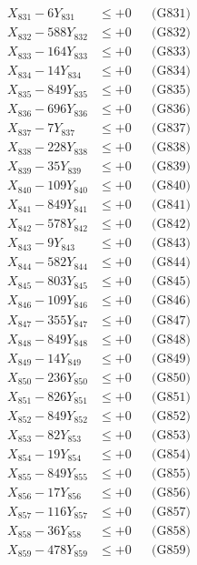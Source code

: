 \documentclass[a4paper,10pt]{article}
\begin{document}
{\begin{align}
\allowbreak
X_{831} - 6Y_{831} &\leq +0 && \text{(G831)} \\
X_{832} - 588Y_{832} &\leq +0 && \text{(G832)} \\
X_{833} - 164Y_{833} &\leq +0 && \text{(G833)} \\
X_{834} - 14Y_{834} &\leq +0 && \text{(G834)} \\
X_{835} - 849Y_{835} &\leq +0 && \text{(G835)} \\
X_{836} - 696Y_{836} &\leq +0 && \text{(G836)} \\
X_{837} - 7Y_{837} &\leq +0 && \text{(G837)} \\
X_{838} - 228Y_{838} &\leq +0 && \text{(G838)} \\
X_{839} - 35Y_{839} &\leq +0 && \text{(G839)} \\
X_{840} - 109Y_{840} &\leq +0 && \text{(G840)} \\
\allowbreak
X_{841} - 849Y_{841} &\leq +0 && \text{(G841)} \\
X_{842} - 578Y_{842} &\leq +0 && \text{(G842)} \\
X_{843} - 9Y_{843} &\leq +0 && \text{(G843)} \\
X_{844} - 582Y_{844} &\leq +0 && \text{(G844)} \\
X_{845} - 803Y_{845} &\leq +0 && \text{(G845)} \\
X_{846} - 109Y_{846} &\leq +0 && \text{(G846)} \\
X_{847} - 355Y_{847} &\leq +0 && \text{(G847)} \\
X_{848} - 849Y_{848} &\leq +0 && \text{(G848)} \\
X_{849} - 14Y_{849} &\leq +0 && \text{(G849)} \\
X_{850} - 236Y_{850} &\leq +0 && \text{(G850)} \\
\allowbreak
X_{851} - 826Y_{851} &\leq +0 && \text{(G851)} \\
X_{852} - 849Y_{852} &\leq +0 && \text{(G852)} \\
X_{853} - 82Y_{853} &\leq +0 && \text{(G853)} \\
X_{854} - 19Y_{854} &\leq +0 && \text{(G854)} \\
X_{855} - 849Y_{855} &\leq +0 && \text{(G855)} \\
X_{856} - 17Y_{856} &\leq +0 && \text{(G856)} \\
X_{857} - 116Y_{857} &\leq +0 && \text{(G857)} \\
X_{858} - 36Y_{858} &\leq +0 && \text{(G858)} \\
X_{859} - 478Y_{859} &\leq +0 && \text{(G859)} \\

\end{align}}
\end{document}
